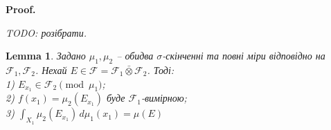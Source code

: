 \documentclass[a4paper, 10pt]{article}
\makeatletter
\theoremstyle{theoremdd}
\newtheorem{lemma}[theorem]{Lemma}
\renewenvironment{proof}[1][Proof.\\]{\par
\pushQED{\hfill \qed}%
\normalfont \topsep6\p@\@plus6\p@\relax
\trivlist
\item\relax
{\bfseries
#1\@addpunct{.}}\hspace\labelsep\ignorespaces
}{%
\popQED\endtrivlist\@endpefalse
}
\makeatother
\begin{document}
\begin{proof}

\textit{TODO: розібрати.}
\end{proof}

\begin{lemma}
Задано $\mu_1,\mu_2$ -- обидва $\sigma$-скінченні та повні міри відповідно на $\mathcal{F}_1,\mathcal{F}_2$. Нехай $E \in \mathcal{F} = \mathcal{F}_1 \bar{\otimes} \mathcal{F}_2$. Тоді:\\
1) $E_{x_1} \in \mathcal{F}_2 \pmod {\mu_1}$;\\
2) $f(x_1) = \mu_2(E_{x_1})$ буде $\mathcal{F}_1$-вимірною;\\
3) $\displaystyle\int_{X_1} \mu_2(E_{x_1})\,d\mu_1(x_1) = \mu(E)$
\end{lemma}
\end{document}
